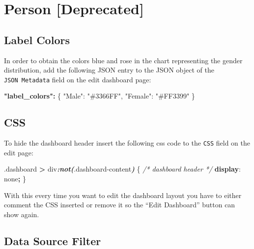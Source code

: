 \documentclass[
]{book}
\newenvironment{Shaded}{\begin{snugshade}}{\end{snugshade}}
\newcommand{\CommentTok}[1]{\textcolor[rgb]{0.56,0.35,0.01}{\textit{#1}}}
\newcommand{\DataTypeTok}[1]{\textcolor[rgb]{0.13,0.29,0.53}{#1}}
\newcommand{\DecValTok}[1]{\textcolor[rgb]{0.00,0.00,0.81}{#1}}
\newcommand{\ErrorTok}[1]{\textcolor[rgb]{0.64,0.00,0.00}{\textbf{#1}}}
\newcommand{\FunctionTok}[1]{\textcolor[rgb]{0.00,0.00,0.00}{#1}}
\newcommand{\InformationTok}[1]{\textcolor[rgb]{0.56,0.35,0.01}{\textbf{\textit{#1}}}}
\newcommand{\KeywordTok}[1]{\textcolor[rgb]{0.13,0.29,0.53}{\textbf{#1}}}
\newcommand{\NormalTok}[1]{#1}
\newcommand{\OperatorTok}[1]{\textcolor[rgb]{0.81,0.36,0.00}{\textbf{#1}}}
\newcommand{\StringTok}[1]{\textcolor[rgb]{0.31,0.60,0.02}{#1}}
\begin{document}
\hypertarget{person-deprecated}{%
\section{Person {[}Deprecated{]}}\label{person-deprecated}}

\hypertarget{label-colors-2}{%
\subsection*{Label Colors}\label{label-colors-2}}

In order to obtain the colors blue and rose in the chart representing the gender distribution,
add the following JSON entry to the JSON object of the \texttt{JSON\ Metadata} field on the edit dashboard page:

\begin{Shaded}
\begin{Highlighting}[]
\ErrorTok{"label\_colors":} \FunctionTok{\{}
    \DataTypeTok{"Male"}\FunctionTok{:} \StringTok{"\#3366FF"}\FunctionTok{,} 
    \DataTypeTok{"Female"}\FunctionTok{:} \StringTok{"\#FF3399"}
\FunctionTok{\}}
\end{Highlighting}
\end{Shaded}

\hypertarget{css-3}{%
\subsection*{CSS}\label{css-3}}

To hide the dashboard header insert the following css code to the \texttt{CSS} field on the edit page:

\begin{Shaded}
\begin{Highlighting}[]
\FunctionTok{.dashboard} \OperatorTok{\textgreater{}}\NormalTok{ div}\InformationTok{:not(}\FunctionTok{.dashboard{-}content}\InformationTok{)}\NormalTok{ \{  }\CommentTok{/* dashboard header */}
  \KeywordTok{display}\NormalTok{: }\DecValTok{none}\OperatorTok{;}
\NormalTok{\}}
\end{Highlighting}
\end{Shaded}

With this every time you want to edit the dashboard layout you have to either comment the CSS inserted
or remove it so the ``Edit Dashboard'' button can show again.

\hypertarget{data-source-filter-1}{%
\subsection*{Data Source Filter}\label{data-source-filter-1}}
\end{document}
